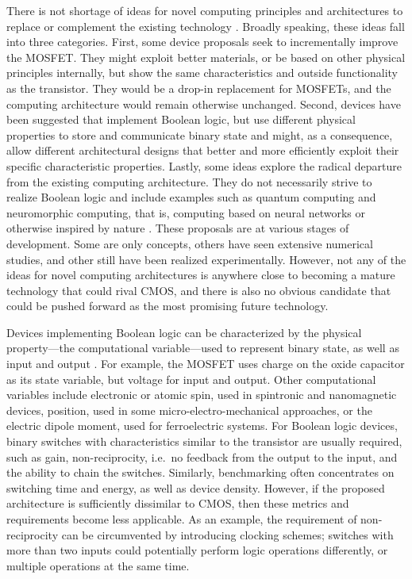 There is not shortage of ideas for novel computing principles and architectures
to replace or complement the existing technology \cite{cavin2012science}
\cite{bernstein2010device}. Broadly speaking, these ideas fall into three
categories. First, some device proposals seek to incrementally improve the
MOSFET. They might exploit better materials, or be based on other physical
principles internally, but show the same characteristics and outside
functionality as the transistor. They would be a drop-in replacement for
MOSFETs, and the computing architecture would remain otherwise unchanged.
Second, devices have been suggested that implement Boolean logic, but use
different physical properties to store and communicate binary state and might,
as a consequence, allow different architectural designs that better and more
efficiently exploit their specific characteristic properties. Lastly, some ideas
explore the radical departure from the existing computing architecture. They do
not necessarily strive to realize Boolean logic and include examples such as
quantum computing and neuromorphic computing, that is, computing based on neural
networks or otherwise inspired by nature \cite{mead1990neuromorphic}
\cite{schemmel2010wafer} \cite{furber2012overview}. These proposals are at
various stages of development. Some are only concepts, others have seen
extensive numerical studies, and other still have been realized experimentally.
However, not any of the ideas for novel computing architectures is anywhere
close to becoming a mature technology that could rival CMOS, and there is also
no obvious candidate that could be pushed forward as the most promising future
technology.

Devices implementing Boolean logic can be characterized by the physical
property---the computational variable---used to represent binary state, as well
as input and output \cite{nikonov2013overview}. For example, the MOSFET uses
charge on the oxide capacitor as its state variable, but voltage for input and
output. Other computational variables include electronic or atomic spin, used in
spintronic and nanomagnetic devices, position, used in some
micro-electro-mechanical approaches, or the electric dipole moment, used for
ferroelectric systems. For Boolean logic devices, binary switches with
characteristics similar to the transistor are usually required, such as gain,
non-reciprocity, i.e.~no feedback from the output to the input, and the ability
to chain the switches. Similarly, benchmarking often concentrates on switching
time and energy, as well as device density. However, if the proposed
architecture is sufficiently dissimilar to CMOS, then these metrics and
requirements become less applicable. As an example, the requirement of
non-reciprocity can be circumvented by introducing clocking schemes; switches
with more than two inputs could potentially perform logic operations
differently, or multiple operations at the same time.

